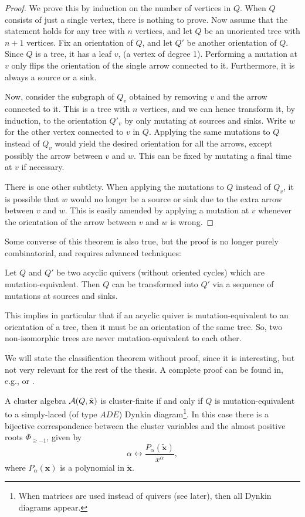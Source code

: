 \documentclass{article}
\newcommand{\bx}{\mathbf{x}}
\newcommand{\tbx}{\tilde{\bx}}
\begin{document}
\begin{proof}
	We prove this by induction on the number of vertices in $Q$. When $Q$ consists of just a single vertex, there is nothing to prove. Now assume that the statement holds for any tree with $n$ vertices, and let $Q$ be an unoriented tree with $n+1$ vertices. Fix an orientation of $Q$, and let $Q'$ be another orientation of $Q$. Since $Q$ is a tree, it has a leaf $v$, (a vertex of degree 1). Performing a mutation at $v$ only flips the orientation of the single arrow connected to it. Furthermore, it is always a source or a sink.

	Now, consider the subgraph of $Q_v$ obtained by removing $v$ and the arrow connected to
	it. This is a tree with $n$ vertices, and we can hence transform it, by induction, to
	the orientation $Q'_v$ by only mutating at sources and sinks. Write $w$ for the other
	vertex connected to $v$ in $Q$. Applying the same mutations to $Q$ instead of $Q_v$
	would yield the desired orientation for all the arrows, except possibly the arrow
	between $v$ and $w$. This can be fixed by mutating a final time at $v$ if necessary.

	There is one other subtlety. When applying the mutations to $Q$ instead of $Q_v$, it is
	possible that $w$ would no longer be a source or sink due to the extra arrow between
	$v$ and $w$. This is easily amended by applying a mutation at $v$ whenever the
	orientation of the arrow between $v$ and $w$ is wrong.
\end{proof}
Some converse of this theorem is also true, but the proof is no longer purely combinatorial, and requires advanced techniques:
\begin{theorem}
	Let $Q$ and $Q'$ be two acyclic quivers (without oriented cycles) which are mutation-equivalent. Then $Q$ can be transformed into $Q'$ via a sequence of mutations at sources and sinks.
\end{theorem}
This implies in particular that if an acyclic quiver is mutation-equivalent to an
orientation of a tree, then it must be an orientation of the same tree. So, two
non-isomorphic trees are never mutation-equivalent to each other.

We will state the classification theorem without proof, since it is interesting, but
not very relevant for the rest of the thesis. A complete proof can be found in, e.g.,
\cite{FominZelevinsky2003CAFin} or \cite{FominWilliams2021IntroductionCA_4-5}.
\begin{theorem}
	A cluster algebra $\mcA (Q, \tbx)$ is cluster-finite if and only if $Q$ is
	mutation-equivalent to a simply-laced (of type $ADE$) Dynkin diagram\footnote{When matrices are used instead of quivers (see later), then all Dynkin diagrams appear.}. In this case there is a bijective correspondence between the cluster variables and the almost positive roots $\Phi_{\geq -1}$, given by
	\begin{equation*}
		\alpha \leftrightarrow \frac{P_\alpha (\tbx)}{x^\alpha},
	\end{equation*}
	where $P_\alpha (\bx)$ is a polynomial in $\tbx$.
\end{theorem}
\end{document}
